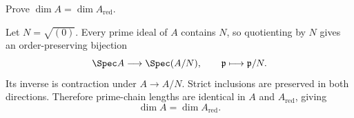 \begin{problem}\label{prob:vi29-10}
Prove \(\dim A=\dim A_{\mathrm{red}}\).

\end{problem}

\ifdefined\FullProblemDossiers
\begin{solution}
Let \(N=\sqrt{(0)}\).  Every prime ideal of \(A\) contains \(N\), so quotienting by \(N\) gives an
order-preserving bijection
\[
\Spec A\longrightarrow\Spec(A/N),
\qquad
\mathfrak p\longmapsto\mathfrak p/N.
\]
Its inverse is contraction under \(A\to A/N\).  Strict inclusions are preserved in both directions.  Therefore
prime-chain lengths are identical in \(A\) and \(A_{\mathrm{red}}\), giving
\[
\boxed{\dim A=\dim A_{\mathrm{red}}}.
\]
\end{solution}
\fi
